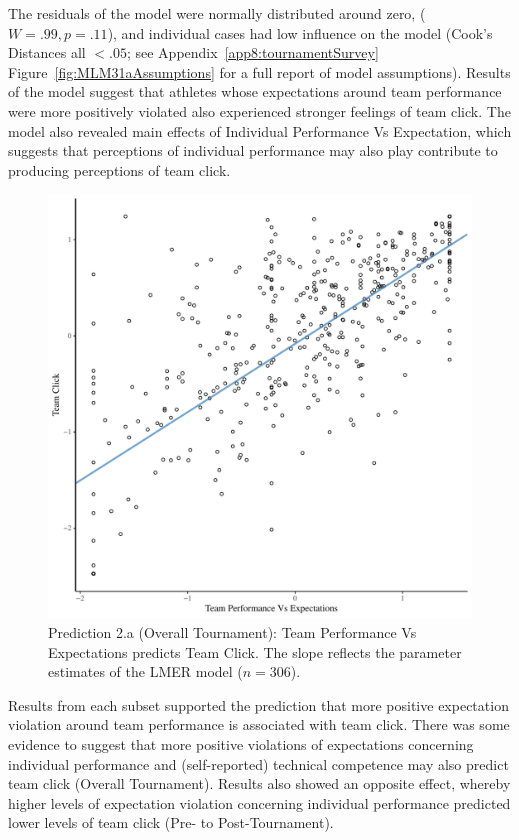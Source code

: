 \begin{CJK}{UTF8}{gbsn}
The residuals of the model were normally distributed around zero, ($W = .99, p = .11$), and individual cases had low influence on the model (Cook's Distances all $< .05$; see Appendix~\ref{app8:tournamentSurvey} Figure~\ref{fig:MLM31aAssumptions} for a full report of model assumptions).  Results of the model suggest that athletes whose expectations around team performance were more positively violated also experienced stronger feelings of team click.  The model also revealed main effects of Individual Performance Vs Expectation, which suggests that perceptions of individual performance may also play contribute to producing perceptions of team click.

   \begin{figure}[htbp]
     \centering
   \includegraphics[scale=.5]{images/teamPerfClickOverallModelSlope.pdf}
     \caption{Prediction 2.a (Overall Tournament): Team Performance Vs Expectations predicts Team Click.  The slope reflects the parameter estimates of the LMER model ($n = 306$).}
     \label{fig:teamPerfClickOverallModelSlope}
   \end{figure}


Results from each subset supported the prediction that more positive expectation violation around team performance is associated with team click.  There was some evidence to suggest that more positive violations of expectations concerning individual performance and (self-reported) technical competence may also predict team click (Overall Tournament).  Results also showed an opposite effect, whereby higher levels of expectation violation concerning individual performance predicted lower levels of team click (Pre- to Post-Tournament).





\end{CJK}
